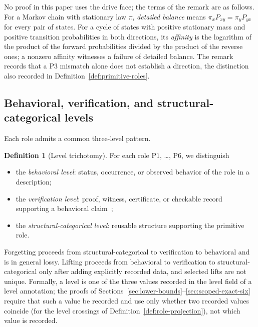 \documentclass[11pt]{article}
\theoremstyle{definition}
\newtheorem{definition}[theorem]{Definition}
\newcommand{\Pone}{\ensuremath{\mathrm{P1}}}
\newcommand{\Pthree}{\ensuremath{\mathrm{P3}}}
\newcommand{\Psix}{\ensuremath{\mathrm{P6}}}
\begin{document}
No proof in this paper uses the drive face; the terms of the remark are as
follows. For a Markov chain with stationary law \(\pi\), \emph{detailed balance}
means \(\pi_x P_{xy}=\pi_y P_{yx}\) for every pair of states. For a
cycle of states with positive stationary mass and positive transition
probabilities in both directions,
its \emph{affinity} is the logarithm of the product of the forward
probabilities divided by the product of the reverse ones; a nonzero
affinity witnesses a failure of detailed balance. The remark records that a \Pthree{} mismatch alone does
not establish a direction, the distinction also recorded in
Definition~\ref{def:primitive-roles}.

\subsection{Behavioral, verification, and structural-categorical levels}\label{subsec:levels}

Each role admits a common three-level pattern.

\begin{definition}[Level trichotomy]\label{def:level-trichotomy}
For each role \Pone{}, \ldots, \Psix{}, we distinguish
\begin{itemize}[topsep=2pt,itemsep=1pt]
  \item the \emph{behavioral level}: status, occurrence, or observed
    behavior of the role in a description;
  \item the \emph{verification level}: proof, witness, certificate, or
    checkable record supporting a behavioral
    claim~\citep{MartinLof1984};
  \item the \emph{structural-categorical level}: reusable structure
    supporting the primitive role.
\end{itemize}
Forgetting proceeds from structural-categorical to verification to
behavioral and is in general lossy. Lifting proceeds from behavioral to
verification to structural-categorical only after adding explicitly
recorded data, and selected lifts are not unique. Formally, a level is one of
the three values recorded in the level field of a level annotation; the
proofs of Sections~\ref{sec:lower-bounds}--\ref{sec:scoped-exact-six} require
that such a value be recorded and use only whether two recorded values coincide
(for the level crossings of Definition~\ref{def:role-projection}), not which
value is recorded.
\end{definition}
\end{document}
